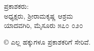\thispagestyle{empty}

\begin{center}
ಪ್ರಕಾಶಕರು: \\ಅಧ್ಯಕ್ಷರು, ಶ್ರೀರಾಮಕೃಷ್ಣ ಆಶ್ರಮ\\ಯಾದವಗಿರಿ, ಮೈಸೂರು ೫೭೦ ೦೨೦
\end{center}

\begin{center}
© ಎಲ್ಲ ಹಕ್ಕುಗಳೂ ಪ್ರಕಾಶಕರಿಗೆ ಸೇರಿವೆ.
\end{center}

